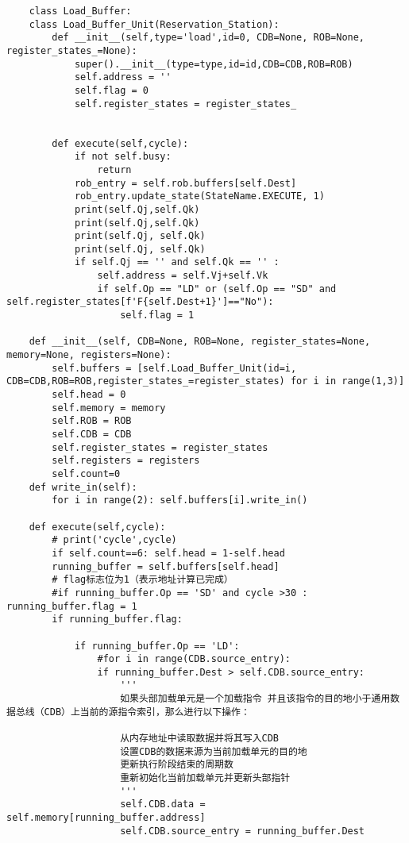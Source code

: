 \documentclass{article}
\begin{document}
\begin{lstlisting}
    class Load_Buffer:
    class Load_Buffer_Unit(Reservation_Station):
        def __init__(self,type='load',id=0, CDB=None, ROB=None, register_states_=None):
            super().__init__(type=type,id=id,CDB=CDB,ROB=ROB)
            self.address = ''
            self.flag = 0
            self.register_states = register_states_


        def execute(self,cycle):
            if not self.busy:
                return
            rob_entry = self.rob.buffers[self.Dest]
            rob_entry.update_state(StateName.EXECUTE, 1)
            print(self.Qj,self.Qk)
            print(self.Qj,self.Qk)
            print(self.Qj, self.Qk)
            print(self.Qj, self.Qk)
            if self.Qj == '' and self.Qk == '' :
                self.address = self.Vj+self.Vk
                if self.Op == "LD" or (self.Op == "SD" and self.register_states[f'F{self.Dest+1}']=="No"):
                    self.flag = 1

    def __init__(self, CDB=None, ROB=None, register_states=None, memory=None, registers=None):
        self.buffers = [self.Load_Buffer_Unit(id=i, CDB=CDB,ROB=ROB,register_states_=register_states) for i in range(1,3)]
        self.head = 0
        self.memory = memory
        self.ROB = ROB
        self.CDB = CDB
        self.register_states = register_states
        self.registers = registers
        self.count=0
    def write_in(self):
        for i in range(2): self.buffers[i].write_in() 

    def execute(self,cycle):
        # print('cycle',cycle)
        if self.count==6: self.head = 1-self.head
        running_buffer = self.buffers[self.head]
        # flag标志位为1（表示地址计算已完成）
        #if running_buffer.Op == 'SD' and cycle >30 : running_buffer.flag = 1
        if running_buffer.flag:
            
            if running_buffer.Op == 'LD':
                #for i in range(CDB.source_entry):
                if running_buffer.Dest > self.CDB.source_entry:
                    '''
                    如果头部加载单元是一个加载指令 并且该指令的目的地小于通用数据总线（CDB）上当前的源指令索引，那么进行以下操作：
                    
                    从内存地址中读取数据并将其写入CDB
                    设置CDB的数据来源为当前加载单元的目的地
                    更新执行阶段结束的周期数
                    重新初始化当前加载单元并更新头部指针
                    '''
                    self.CDB.data = self.memory[running_buffer.address]
                    self.CDB.source_entry = running_buffer.Dest
                    


\end{lstlisting}
\end{document}
